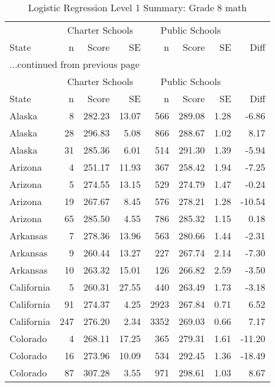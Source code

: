 \begin{longtable}{lrrr@{\extracolsep{10pt}}rrrr}
\caption{Logistic Regression Level 1 Summary: Grade 8 math} \\ 
  \hline
  & \multicolumn{3}{c}{Charter Schools} & \multicolumn{3}{c}{Public Schools} & \\ \cline{2-4} \cline{5-7} State & n & Score & SE & n & Score & SE & Diff \\ \endfirsthead \multicolumn{8}{l}{{...continued from previous page}}\\ \hline & \multicolumn{3}{c}{Charter Schools} & \multicolumn{3}{c}{Public Schools} & \\ \cline{2-4} \cline{5-7} State & n & Score & SE & n & Score & SE & Diff \\ \hline \endhead \hline \endfoot \endlastfoot \hline
Alaska &   8 & 282.23 & 13.07 & 566 & 289.08 & 1.28 & -6.86 \\ 
  Alaska &  28 & 296.83 & 5.08 & 866 & 288.67 & 1.02 & 8.17 \\ 
  Alaska &  31 & 285.36 & 6.01 & 514 & 291.30 & 1.39 & -5.94 \\ 
  Arizona &   4 & 251.17 & 11.93 & 367 & 258.42 & 1.94 & -7.25 \\ 
  Arizona &   5 & 274.55 & 13.15 & 529 & 274.79 & 1.47 & -0.24 \\ 
  Arizona &  19 & 267.67 & 8.45 & 576 & 278.21 & 1.28 & -10.54 \\ 
  Arizona &  65 & 285.50 & 4.55 & 786 & 285.32 & 1.15 & 0.18 \\ 
  Arkansas &   7 & 278.36 & 13.96 & 563 & 280.66 & 1.44 & -2.31 \\ 
  Arkansas &   9 & 260.44 & 13.27 & 227 & 267.74 & 2.14 & -7.30 \\ 
  Arkansas &  10 & 263.32 & 15.01 & 126 & 266.82 & 2.59 & -3.50 \\ 
  California &   5 & 260.31 & 27.55 & 440 & 263.49 & 1.73 & -3.18 \\ 
  California &  91 & 274.37 & 4.25 & 2923 & 267.84 & 0.71 & 6.52 \\ 
  California & 247 & 276.20 & 2.34 & 3352 & 269.03 & 0.66 & 7.17 \\ 
  Colorado &   4 & 268.11 & 17.25 & 365 & 279.31 & 1.61 & -11.20 \\ 
  Colorado &  16 & 273.96 & 10.09 & 534 & 292.45 & 1.36 & -18.49 \\ 
  Colorado &  87 & 307.28 & 3.55 & 971 & 298.61 & 1.03 & 8.67 \\ 

\end{longtable}
